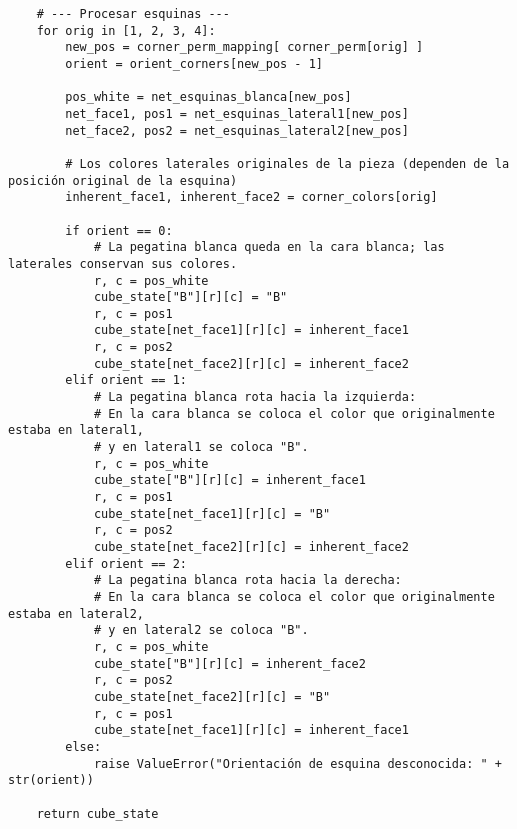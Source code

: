 \begin{lstlisting}
    # --- Procesar esquinas ---
    for orig in [1, 2, 3, 4]:
        new_pos = corner_perm_mapping[ corner_perm[orig] ]
        orient = orient_corners[new_pos - 1]
        
        pos_white = net_esquinas_blanca[new_pos]
        net_face1, pos1 = net_esquinas_lateral1[new_pos]
        net_face2, pos2 = net_esquinas_lateral2[new_pos]
        
        # Los colores laterales originales de la pieza (dependen de la posición original de la esquina)
        inherent_face1, inherent_face2 = corner_colors[orig]
        
        if orient == 0:
            # La pegatina blanca queda en la cara blanca; las laterales conservan sus colores.
            r, c = pos_white
            cube_state["B"][r][c] = "B"
            r, c = pos1
            cube_state[net_face1][r][c] = inherent_face1
            r, c = pos2
            cube_state[net_face2][r][c] = inherent_face2
        elif orient == 1:
            # La pegatina blanca rota hacia la izquierda:
            # En la cara blanca se coloca el color que originalmente estaba en lateral1,
            # y en lateral1 se coloca "B".
            r, c = pos_white
            cube_state["B"][r][c] = inherent_face1
            r, c = pos1
            cube_state[net_face1][r][c] = "B"
            r, c = pos2
            cube_state[net_face2][r][c] = inherent_face2
        elif orient == 2:
            # La pegatina blanca rota hacia la derecha:
            # En la cara blanca se coloca el color que originalmente estaba en lateral2,
            # y en lateral2 se coloca "B".
            r, c = pos_white
            cube_state["B"][r][c] = inherent_face2
            r, c = pos2
            cube_state[net_face2][r][c] = "B"
            r, c = pos1
            cube_state[net_face1][r][c] = inherent_face1
        else:
            raise ValueError("Orientación de esquina desconocida: " + str(orient))
    
    return cube_state

\end{lstlisting}
